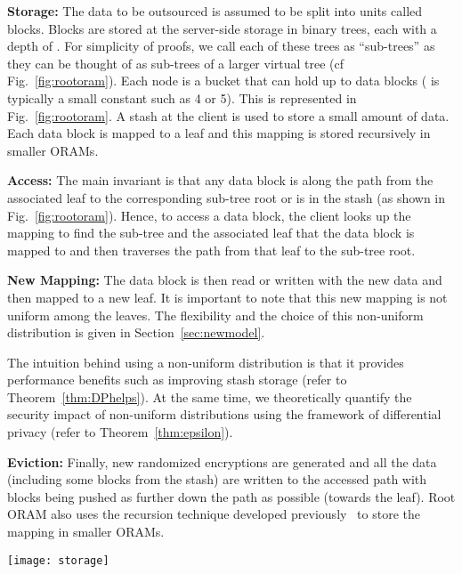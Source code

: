 \documentclass[USenglish,oneside,twocolumn]{article}
\newcommand{\ourprotocol}{Root ORAM}
\begin{document}
\textbf{Storage: }The data to be outsourced is assumed to be split into units called blocks. Blocks are stored at the server-side storage in  binary trees, each with a depth of . For simplicity of proofs, we call each of these trees as ``sub-trees'' as they can be thought of as sub-trees of a larger virtual tree (cf Fig.~\ref{fig:rootoram}). Each node is a bucket that can hold up to  data blocks ( is typically a small constant such as 4 or 5). This is represented in Fig.~\ref{fig:rootoram}. A stash at the client is used to store a small amount of data. Each data block is mapped to a leaf and this mapping is stored recursively in smaller ORAMs.

\textbf{Access: }The main invariant is that any data block is along the path from the associated leaf to the corresponding sub-tree root or is in the stash (as shown in Fig.~\ref{fig:rootoram}). Hence, to access a data block, the client looks up the mapping to find the sub-tree and the associated leaf that the data block is mapped to and then traverses the path from that leaf to the sub-tree root.

\textbf{New Mapping: }The data block is then read or written with the new data and then mapped to a new leaf. It is important to note that this new mapping is not uniform among the leaves. The flexibility and the choice of this non-uniform distribution is given in Section~\ref{sec:newmodel}.

The intuition behind using a non-uniform distribution is that it provides performance benefits such as improving stash storage (refer to Theorem~\ref{thm:DPhelps}). At the same time, we theoretically quantify the security impact of non-uniform distributions using the framework of differential privacy (refer to Theorem~\ref{thm:epsilon}).

\textbf{Eviction: }Finally, new randomized encryptions are generated and all the data (including some blocks from the stash) are written to the accessed path with blocks being pushed as further down the path as possible (towards the leaf). \ourprotocol{} also uses the recursion technique developed previously~\cite{tree_based_orams, SSSoram, pathoram} to store the mapping in smaller ORAMs. 


\begin{figure*}
\center
\texttt{[image: storage]}
\vspace{-5pt}
\caption{\textbf{The figure illustrates the client and server side storage. At the server side, there are  sub-trees, each having a depth of . An individual sub-tree is boxed and shown in red. }}
\label{fig:rootoram}
\vspace{-4pt}
\end{figure*}
\end{document}
